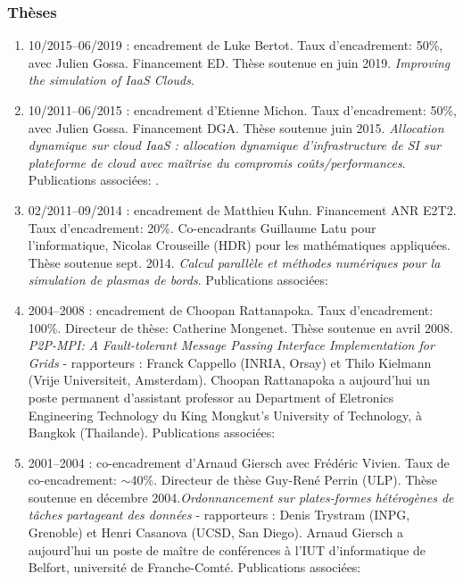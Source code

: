 \subsubsection{Thèses}
\begin{enumerate}

\item 10/2015--06/2019 : encadrement de Luke Bertot. Taux d'encadrement: 50\%,
  avec Julien Gossa. Financement ED. Thèse soutenue en juin 2019. \textit{Improving the simulation of IaaS Clouds}.\\

\item 10/2011--06/2015 : encadrement d'Etienne Michon. Taux d'encadrement: 50\%,
	  avec Julien Gossa. Financement DGA. Thèse soutenue juin 2015. \emph{Allocation dynamique sur cloud IaaS : allocation dynamique d’infrastructure de SI sur plateforme de cloud avec maîtrise du compromis coûts/performances}. Publications associées: \cite{michon2012,MichonGGFB13,icps-2016-fgcs}.\\

\item 02/2011--09/2014 : encadrement de Matthieu Kuhn. Financement ANR E2T2. 
Taux d'encadrement: 20\%. Co-encadrants Guillaume Latu pour 
l'informatique, Nicolas Crouseille (HDR) pour les mathématiques appliquées. Thèse soutenue sept. 2014. \textit{Calcul parallèle et méthodes numériques pour la simulation de plasmas de bords}.
Publications associées: \cite{icps-europar-2015,KuhnLGC13,ketterlin11}\\

\item 2004--2008 : encadrement de Choopan Rattanapoka. Taux d'encadrement: 100\%. 
Directeur de thèse: Catherine Mongenet. Thèse soutenue en avril 2008.
\textit{P2P-MPI: A Fault-tolerant Message Passing Interface Implementation 
for Grids} - rapporteurs : Franck Cappello (INRIA, Orsay) et Thilo Kielmann (Vrije 
Universiteit, Amsterdam). Choopan Rattanapoka a aujourd'hui un poste permanent 
d'assistant professor au Department of Eletronics Engineering Technology du King 
Mongkut's University of Technology, à Bangkok (Thailande).
Publications associées: 
\cite{icps-2005-155,icps-2007-182,icps-2007-185,
      icps-2008-188,icps-2008-193,icps-2009-214,
	icps-2009-217,icps-book}\\


\item 2001--2004 : co-encadrement d'Arnaud Giersch avec Frédéric Vivien. 
Taux de co-encadrement: $\sim$40\%. Directeur de thèse Guy-René Perrin (ULP).
Thèse soutenue en décembre 2004.\textit{Ordonnancement 
sur plates-formes hétérogènes de tâches partageant des données} - rapporteurs : Denis 
Trystram (INPG, Grenoble) et Henri Casanova (UCSD, San Diego). Arnaud Giersch a 
aujourd'hui un poste de maître de conférences à l'IUT d'informatique de Belfort, 
université de Franche-Comté.
Publications associées: \cite{icps-2002-62,icps-2003-75,icps-2004-125}\\



\end{enumerate}
